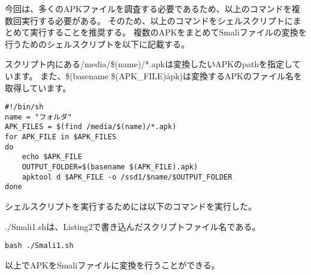 \documentclass[a4j]{jarticle}
\begin{document}
今回は、多くのAPKファイルを調査する必要であるため、以上のコマンドを複数回実行する必要がある。
そのため、以上のコマンドをシェルスクリプトにまとめて実行することを推奨する。
複数のAPKをまとめてSmaliファイルの変換を行うためのシェルスクリプトを以下に記載する。

スクリプト内にある/media/\$(name)/*.apkは変換したいAPKのpathを指定しています。
また、\$(basename \$(APK\_FILE)\.apk)は変換するAPKのファイル名を取得しています。
\begin{lstlisting}[caption=複数のAPKからSmaliファイルの変換を行うシェルスクリプト]
#!/bin/sh
name = "フォルダ"
APK_FILES = $(find /media/$(name)/*.apk)
for APK_FILE in $APK_FILES
do
	echo $APK_FILE
	OUTPUT_FOLDER=$(basename $(APK_FILE).apk)
	apktool d $APK_FILE -o /ssd1/$name/$OUTPUT_FOLDER
done
\end{lstlisting}
シェルスクリプトを実行するためには以下のコマンドを実行した。

./Smali1.shは、Listing2で書き込んだスクリプトファイル名である。
\begin{lstlisting}[caption=シェルスクリプトの実行方法]
bash ./Smali1.sh　
\end{lstlisting}
以上でAPKをSmaliファイルに変換を行うことができる。
\end{document}
